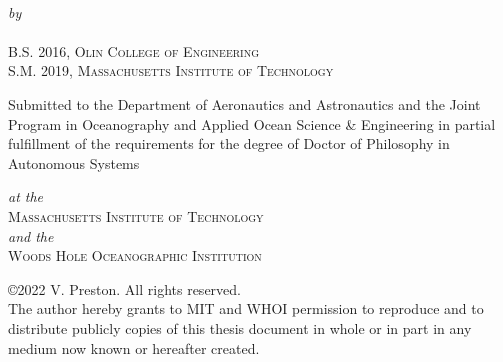 \begin{titlepage}
  \begin{center}
    \begin{Large}
      \@title
    \end{Large}\\[0.1em]
    \emph{\footnotesize by}\\
    {\large \@author} \\[-0.25em]
    B.S. 2016, \textsc{Olin College of Engineering} \\
    S.M. 2019, \textsc{Massachusetts Institute of Technology} \\ [1em]
    \begin{singlespace}
    {Submitted to the Department of Aeronautics and Astronautics and the Joint Program in Oceanography and Applied Ocean Science \& Engineering in partial fulfillment of the requirements for the degree of Doctor of Philosophy in Autonomous Systems} \\
    \end{singlespace}
    \emph{\footnotesize at the}\\
    {\large \textsc{Massachusetts Institute of Technology}} \\
    \emph{\footnotesize and the}\\
    {\large \textsc{Woods Hole Oceanographic Institution}} \\ [1em]
    \begin{singlespace}
    {\small \copyright2022 V. Preston. All rights reserved. \\ \footnotesize The author hereby grants to MIT and WHOI permission to reproduce and to distribute publicly copies of this thesis document in whole or in part in any medium now known or hereafter created.} \\ [2em]


\end{singlespace}
\end{center}
\end{titlepage}
